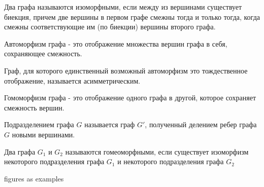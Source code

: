 
\begin{definition}
  Два графа называются изоморфными, если между из вершинами существует биекция,
  причем две вершины в первом графе смежны тогда и только тогда, когда смежны
  соответствующие им (по биекции) вершины второго графа.
\end{definition}

\begin{definition}
  Автоморфизм графа - это отображение множества вершин графа в себя, сохраняющее
  смежность.
\end{definition}

\begin{remark}
  Граф, для которого единственный возможный автоморфизм это тождественное
  отображение, называется асимметрическим.
\end{remark}

\begin{definition}
  Гомоморфизм графа - это отображение одного графа в другой, которое сохраняет
  смежность вершин.
\end{definition}

\begin{definition}
  Подразделением графа \(G\) называется граф \(G'\), полученный делением ребер
  графа \(G\) новыми вершинами.
\end{definition}

\begin{definition}
  Два графа \(G_{1}\) и \(G_{2}\) называются гомеоморфными, если существует
  изоморфизм некоторого подразделения графа \(G_{1}\) и некоторого подразделения
  графа \(G_{2}\)
\end{definition}

\todo figures as examples
